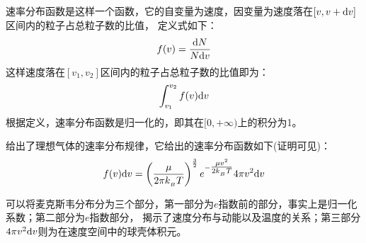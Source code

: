         \subsection[麦克斯韦分布]{}
            速率分布函数是这样一个函数，它的自变量为速度，因变量为速度落在$[v,v+\mathrm{d}{v}]$区间内的粒子占总粒子数的比值，
            定义式如下：
            \begin{equation}
                f(v) = \frac{\mathrm{d}{N}}{N\mathrm{d}{v}}
                \nonumber
            \end{equation}
            这样速度落在$[v_{1},v_{2}]$区间内的粒子占总粒子数的比值即为：
            \begin{equation}
                \int_{v_{1}}^{v_{2}} f(v)\mathrm{d}{v}
                \nonumber
            \end{equation}
            根据定义，速率分布函数是归一化的，即其在$[0,+\infty)$上的积分为1。
                
            给出了理想气体的速率分布规律，它给出的速率分布函数如下(证明可见)：
            \begin{equation}
                f(v)\mathrm{d}{v}=\left(\frac \mu{2\pi k_{_B}T}\right)^{\frac{3}{2}}e^{-\tfrac{\mu v^{2}}{2k_{_B}T}}4\pi v^2\mathrm{d}{v}
                \nonumber
            \end{equation}
            
            可以将麦克斯韦分布分为三个部分，第一部分为$e$指数前的部分，事实上是归一化系数；第二部分为$e$指数部分，
            揭示了速度分布与动能以及温度的关系；第三部分$4\pi v^{2}\mathrm{d}{v}$则为在速度空间中的球壳体积元。

